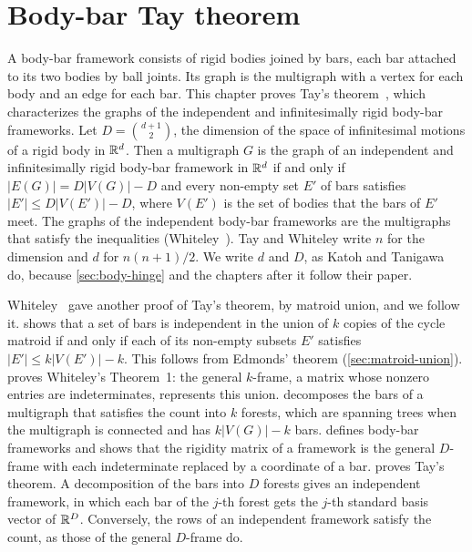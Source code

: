 \section{Body-bar Tay theorem}
\label{sec:body-bar}

A body-bar framework consists of rigid bodies joined by bars, each bar
attached to its two bodies by ball joints. Its graph is the multigraph
with a vertex for each body and an edge for each bar. This chapter
proves Tay's theorem~\cite{tay1984}, which characterizes the graphs of
the independent and infinitesimally rigid body-bar frameworks. Let
$D = \binom{d+1}{2}$, the dimension of the space of infinitesimal
motions of a rigid body in ${\mathbb{R}}^d$. Then a multigraph $G$ is the graph
of an independent and infinitesimally rigid body-bar framework in
${\mathbb{R}}^d$ if and only if $|E(G)| = D|V(G)| - D$ and every non-empty set
$E'$ of bars satisfies $|E'| \le D|V(E')| - D$, where $V(E')$ is the
set of bodies that the bars of $E'$ meet. The graphs of the independent
body-bar frameworks are the multigraphs that satisfy the inequalities
(Whiteley~\cite[Theorem~8]{whiteley1988}). Tay and Whiteley write $n$
for the dimension and $d$ for $n(n+1)/2$. We write $d$ and $D$, as
Katoh and Tanigawa~\cite{katohTanigawa2011} do, because
\cref{sec:body-hinge} and the chapters after it follow their paper.

Whiteley~\cite{whiteley1988} gave another proof of Tay's theorem, by
matroid union, and we follow it. 
shows that a set of bars is independent in the union of $k$ copies of
the cycle matroid if and only if each of its non-empty subsets $E'$
satisfies $|E'| \le k|V(E')| - k$. This follows from Edmonds' theorem
(\cref{sec:matroid-union}).  proves
Whiteley's Theorem~1: the general $k$-frame, a matrix whose nonzero
entries are indeterminates, represents this union.
 decomposes the bars of a multigraph
that satisfies the count into $k$ forests, which are spanning trees
when the multigraph is connected and has $k|V(G)| - k$ bars.
 defines body-bar frameworks and shows that
the rigidity matrix of a framework is the general $D$-frame with each
indeterminate replaced by a coordinate of a bar. 
proves Tay's theorem. A decomposition of the bars into $D$ forests gives
an independent framework, in which each bar of the $j$-th forest gets
the $j$-th standard basis vector of ${\mathbb{R}}^D$. Conversely, the rows of an
independent framework satisfy the count, as those of the general
$D$-frame do.

